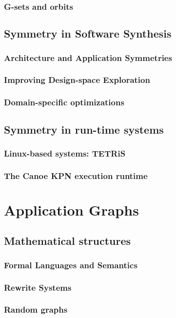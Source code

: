 \documentclass{article}
\begin{document}
\subsubsection{G-sets and orbits}
\subsection{Symmetry in Software Synthesis}
\subsubsection{Architecture and Application Symmetries}
\subsubsection{Improving Design-space Exploration}
\subsubsection{Domain-specific optimizations}
\subsection{Symmetry in run-time systems}
\subsubsection{Linux-based systems: TETRiS}
\subsubsection{The Canoe KPN execution runtime}
\section{Application Graphs}
\subsection{Mathematical structures}
\subsubsection{Formal Languages and Semantics}
\subsubsection{Rewrite Systems}
\subsubsection{Random graphs}
\end{document}
